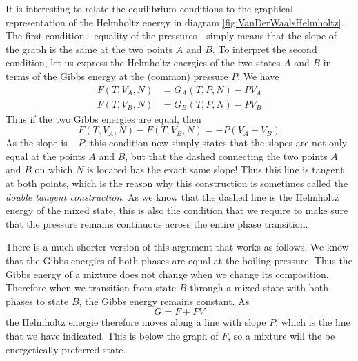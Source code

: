 \documentclass[a4paper, draft]{article}
\theoremstyle{own}
\theoremstyle{remark}
\begin{document}
It is interesting to relate the equilibrium conditions to the graphical representation of the Helmholtz energy in diagram \ref{fig:VanDerWaalsHelmholtz}. The first condition - equality of the pressures - simply means that the slope of the graph is the same at the two points $A$ and $B$. To interpret the second condition, let us express the Helmholtz energies of the two states $A$ and $B$ in terms of the Gibbs energy at the (common) pressure $P$. We have
\begin{align*}
F(T, V_A, N) &= G_A(T, P, N) - P V_A \\
F(T, V_B, N) &= G_B(T, P, N) - P V_B 
\end{align*}
Thus if the two Gibbs energies are equal, then
$$
F(T, V_A, N) - F(T, V_B, N) = -P (V_A - V_B)
$$
As the slope is $-P$, this condition now simply states that the slopes are not only equal at the points $A$ and $B$, but that the dashed connecting the two points $A$ and $B$ on which $N$ is located has the exact same slope! Thus this line is tangent at both points, which is the reason why this construction is sometimes called the {\em double tangent construction}. As we know that the dashed line is the Helmholtz energy of the mixed state, this is also the condition that we require to make sure that the pressure remains continuous across the entire phase transition.

There is a much shorter version of this argument that works as follows. We know that the Gibbs energies of both phases are equal at the boiling pressure. Thus the Gibbs energy of a mixture does not change when we change its composition. Therefore when we transition from state $B$ through a mixed state with both phases to state $B$, the Gibbs energy remains constant. As
$$
G = F + PV
$$
the Helmholtz energie therefore moves along a line with slope $P$, which is the line that we have indicated. This is below the graph of $F$, so a mixture will the be energetically preferred state. 
\end{document}
